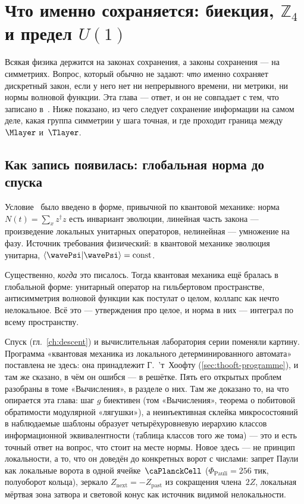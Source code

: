 \chapter{Что именно сохраняется: биекция, \texorpdfstring{$\mathbb{Z}_4$}{Z4} и предел \texorpdfstring{$U(1)$}{U(1)}}
\label{ch:invariant}

Всякая физика держится на законах сохранения, а законы сохранения --- на симметриях.
Вопрос, который обычно не задают: \emph{что} именно сохраняет дискретный закон,
если у него нет ни непрерывного времени, ни метрики, ни нормы волновой функции.
Эта глава --- ответ, и он не совпадает с тем, что записано в~.
Ниже показано, из чего следует сохранение информации на самом деле,
какая группа симметрии у шага точная, и где проходит граница между~$\Mlayer$ и~$\Tlayer$.

\section{Как запись появилась: глобальная норма до спуска}

Условие~ было введено в форме, привычной по квантовой механике:
норма $N(t)=\sum_x z^\dagger z$ есть инвариант эволюции, линейная часть закона ---
произведение локальных унитарных операторов, нелинейная --- умножение на фазу.
Источник требования физический: в квантовой механике эволюция унитарна,
$\langle\wavePsi|\wavePsi\rangle=\mathrm{const}$.

Существенно, \emph{когда} это писалось. Тогда квантовая механика ещё бралась
в глобальной форме: унитарный оператор на гильбертовом пространстве,
антисимметрия волновой функции как постулат о целом, коллапс как нечто нелокальное.
Всё это --- утверждения про целое, и норма в них --- интеграл по всему пространству.

Спуск (гл.~\ref{ch:descent}) и вычислительная лаборатория серии поменяли картину.
Программа «квантовая механика из локального детерминированного автомата» поставлена
не здесь: она принадлежит Г.~’т~Хоофту (\cref{sec:thooft-programme}),
и там же сказано, в чём он ошибся --- в решётке.
Пять его открытых проблем разобраны в томе «Вычисления», в разделе о них.
Там же доказано то, на что опирается эта глава: шаг $g$ биективен
(том «Вычисления», теорема о побитовой обратимости модулярной «лягушки»), а неинъективная склейка микросостояний
в наблюдаемые шаблоны образует четырёхуровневую иерархию классов информационной
эквивалентности (таблица классов того же тома) ---
это и есть точный ответ на вопрос, что стоит на месте нормы.
Новое здесь --- не принцип локальности, а то, что он доведён до конкретных ворот
с числами: запрет Паули как локальные ворота в одной ячейке~$\PlanckCell$
($\Phi_{\mathrm{Pauli}}=256$ тик, полуоборот кольца), зеркало
$Z_{\mathrm{next}}=-Z_{\mathrm{past}}$ из сокращения члена~$2Z$,
локальная мёртвая зона затвора и световой конус как источник видимой нелокальности.

